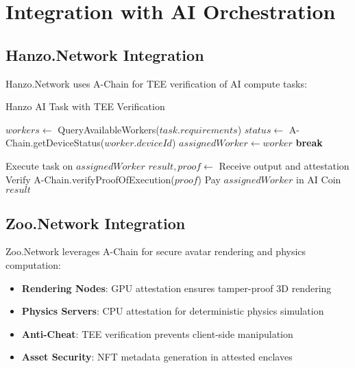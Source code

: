 \documentclass[11pt,a4paper]{article}
\begin{document}
\section{Integration with AI Orchestration}

\subsection{Hanzo.Network Integration}

Hanzo.Network uses A-Chain for TEE verification of AI compute tasks:

\begin{algorithm}[H]
\caption{Hanzo AI Task with TEE Verification}
\begin{algorithmic}[1]
    \State $workers \gets$ QueryAvailableWorkers($task.requirements$)
        \State $status \gets$ A-Chain.getDeviceStatus($worker.deviceId$)
            \State $assignedWorker \gets worker$
            \State \textbf{break}
        \EndIf
    \EndFor
    
    \State Execute task on $assignedWorker$
    \State $result, proof \gets$ Receive output and attestation
    \State Verify A-Chain.verifyProofOfExecution($proof$)
    \State Pay $assignedWorker$ in AI Coin
    \State \Return $result$
\EndFunction
\end{algorithmic}
\end{algorithm}

\subsection{Zoo.Network Integration}

Zoo.Network leverages A-Chain for secure avatar rendering and physics computation:

\begin{itemize}
\item \textbf{Rendering Nodes}: GPU attestation ensures tamper-proof 3D rendering
\item \textbf{Physics Servers}: CPU attestation for deterministic physics simulation
\item \textbf{Anti-Cheat}: TEE verification prevents client-side manipulation
\item \textbf{Asset Security}: NFT metadata generation in attested enclaves
\end{itemize}
\end{document}
